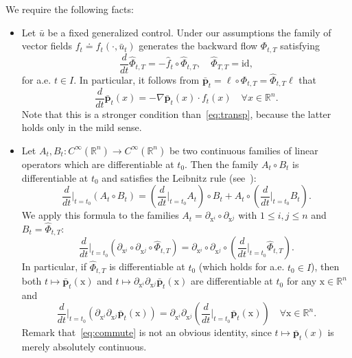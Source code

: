\documentclass[sn-mathphys-num]{sn-jnl}
\numberwithin{equation}{section}
\theoremstyle{mythm}
\theoremstyle{mydef}
\newcommand{\id}{\mathrm{id}}
\renewcommand{\mathbf}[1]{\bm{#1}}
\begin{document}
We require the following facts:
  \begin{itemize}
    \item Let \( \bar{u} \) be a fixed generalized control.  
      Under our assumptions the family of vector fields \( f_t\doteq f_t(\cdot, \bar u_t) \) generates the backward flow \( \Phi_{t,T} \) satisfying 
      \[
        \frac{d}{dt}{\widehat{\Phi}}_{t,T} = - \widehat{f}_t\circ \widehat{\Phi}_{t,T}, \quad \widehat{\Phi}_{T,T}=\id,
      \]
      for a.e. \( t\in I \).
      In particular, it follows from \( \bar{\mathbf{p}}_t = \ell\circ\Phi_{t,T} =\widehat{\Phi}_{t,T}\ell \) that 
      \begin{equation}
        \label{eq:strong}
        \frac{d}{dt} \bar{\mathbf{p}}_t(x) = - \nabla \bar{\mathbf{p}}_t(x)\cdot f_t(x) \quad \forall x\in \mathbb{R}^n. 
      \end{equation}
      Note that this is a stronger condition than~\eqref{eq:transp}, because the latter holds only in the mild sense.

    \item Let \( A_t, B_t \colon C^\infty(\mathbb{R}^n)\to C^{\infty}(\mathbb{R}^n) \) be two continuous families of linear operators which are differentiable at \( t_0 \). Then the family \( A_t \circ B_t \) is differentiable at \( t_0 \) and satisfies the Leibnitz rule (see~\cite[Section~2.3]{agrachevControlTheoryGeometric2004}):
      \[
        \frac{d}{dt}\Big|_{t=t_0}(A_t\circ B_t) = \left(\frac{d}{dt}\Big|_{t=t_0} A_t\right)\circ B_t + A_t \circ \left(\frac{d}{dt}\Big|_{t=t_0} B_t\right).
      \]
      We apply this formula to the families \( A_t = \partial_{\mathrm{x}^i}\circ \partial_{\mathrm{x}^j} \) with \( 1\le i,j\le n \) and \( B_t = \widehat{\Phi}_{t,T} \):  
      \[
        \frac{d}{dt}\Big|_{t=t_0}\left(\partial_{\mathrm{x}^i}\circ \partial_{\mathrm{x}^j}\circ \widehat{\Phi}_{t,T}\right) = \partial_{\mathrm{x}^i}\circ \partial_{\mathrm{x}^j}\circ \left(\frac{d}{dt}\Big|_{t=t_0} \widehat{\Phi}_{t,T}\right).
      \]
      In particular, if \( \widehat{\Phi}_{t,T} \) is differentiable at \( t_0 \) (which holds for a.e. \( t_0\in I \)), then both \( t\mapsto \bar{\mathbf{p}}_t(\mathrm{x}) \) and  \( t\mapsto\partial_{\mathrm{x}^i}\partial_{\mathrm{x}^j}\bar{\mathbf{p}}_t(\mathrm{x})\) are differentiable at \( t_0 \) for any \( \mathrm{x}\in \mathbb{R}^n \) and
      \begin{equation}
        \label{eq:commute}
        \frac{d}{dt}\Big|_{t=t_0}\left(\partial_{\mathrm{x}^i}\partial_{\mathrm{x}^j}\bar{\mathbf{p}}_t(\mathrm{x})\right) = \partial_{\mathrm{x}^i}\partial_{\mathrm{x}^j}\left(\frac{d}{dt}\Big|_{t=t_0}\bar{\mathbf{p}}_t(\mathrm{x})\right) \quad \forall \mathrm{x}\in \mathbb{R}^n.
      \end{equation}
      Remark that~\eqref{eq:commute} is not an obvious identity, since \(t\mapsto \bar{\mathbf{p}}_t(x)\) is merely absolutely continuous. 
  \end{itemize}
\end{document}
